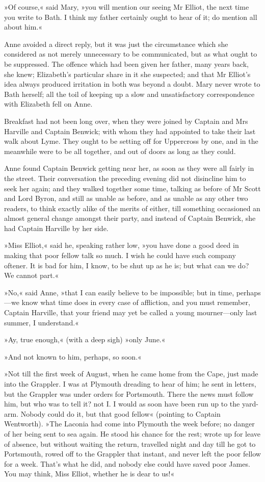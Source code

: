 »Of course,« said Mary, »you will mention our seeing Mr Elliot, the next time you write to Bath. I think my father certainly ought to hear of it; do mention all about him.«

Anne avoided a direct reply, but it was just the circumstance which she considered as not merely unnecessary to be communicated, but as what ought to be suppressed. The offence which had been given her father, many years back, she knew; Elizabeth's particular share in it she suspected; and that Mr Elliot's idea always produced irritation in both was beyond a doubt. Mary never wrote to Bath herself; all the toil of keeping up a slow and unsatisfactory correspondence with Elizabeth fell on Anne.

Breakfast had not been long over, when they were joined by Captain and Mrs Harville and Captain Benwick; with whom they had appointed to take their last walk about Lyme. They ought to be setting off for Uppercross by one, and in the meanwhile were to be all together, and out of doors as long as they could.

Anne found Captain Benwick getting near her, as soon as they were all fairly in the street. Their conversation the preceding evening did not disincline him to seek her again; and they walked together some time, talking as before of Mr Scott and Lord Byron, and still as unable as before, and as unable as any other two readers, to think exactly alike of the merits of either, till something occasioned an almost general change amongst their party, and instead of Captain Benwick, she had Captain Harville by her side.

»Miss Elliot,« said he, speaking rather low, »you have done a good deed in making that poor fellow talk so much. I wish he could have such company oftener. It is bad for him, I know, to be shut up as he is; but what can we do? We cannot part.«

»No,« said Anne, »that I can easily believe to be impossible; but in time, perhaps—we know what time does in every case of affliction, and you must remember, Captain Harville, that your friend may yet be called a young mourner—only last summer, I understand.«

»Ay, true enough,« (with a deep sigh) »only June.«

»And not known to him, perhaps, so soon.«

»Not till the first week of August, when he came home from the Cape, just made into the Grappler. I was at Plymouth dreading to hear of him; he sent in letters, but the Grappler was under orders for Portsmouth. There the news must follow him, but who was to tell it? not I. I would as soon have been run up to the yard-arm. Nobody could do it, but that good fellow« (pointing to Captain Wentworth). »The Laconia had come into Plymouth the week before; no danger of her being sent to sea again. He stood his chance for the rest; wrote up for leave of absence, but without waiting the return, travelled night and day till he got to Portsmouth, rowed off to the Grappler that instant, and never left the poor fellow for a week. That's what he did, and nobody else could have saved poor James. You may think, Miss Elliot, whether he is dear to us!«

